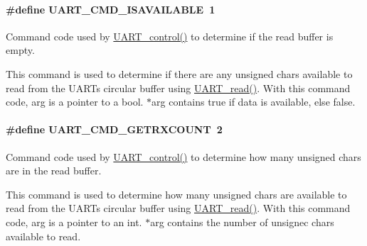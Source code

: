 \paragraph[{U\+A\+R\+T\+\_\+\+C\+M\+D\+\_\+\+I\+S\+A\+V\+A\+I\+L\+A\+B\+L\+E}]{\setlength{\rightskip}{0pt plus 5cm}\#define U\+A\+R\+T\+\_\+\+C\+M\+D\+\_\+\+I\+S\+A\+V\+A\+I\+L\+A\+B\+L\+E~1}\label{_u_a_r_t_8h_af5be6db621c5b048637dc93b26797693}


Command code used by \hyperlink{_u_a_r_t_8h_a9de3c26cfe4ce6b7f350a6ea6e16801d}{U\+A\+R\+T\+\_\+control()} to determine if the read buffer is empty. 

This command is used to determine if there are any unsigned chars available to read from the U\+A\+R\+T\textquotesingle{}s circular buffer using \hyperlink{_u_a_r_t_8h_a023152d57539cad94bdd813956013e73}{U\+A\+R\+T\+\_\+read()}. With this command code, arg is a pointer to a bool. $\ast$arg contains true if data is available, else false. 
\paragraph[{U\+A\+R\+T\+\_\+\+C\+M\+D\+\_\+\+G\+E\+T\+R\+X\+C\+O\+U\+N\+T}]{\setlength{\rightskip}{0pt plus 5cm}\#define U\+A\+R\+T\+\_\+\+C\+M\+D\+\_\+\+G\+E\+T\+R\+X\+C\+O\+U\+N\+T~2}\label{_u_a_r_t_8h_a470321cbd9eccf137ffbe6553ae7f35f}


Command code used by \hyperlink{_u_a_r_t_8h_a9de3c26cfe4ce6b7f350a6ea6e16801d}{U\+A\+R\+T\+\_\+control()} to determine how many unsigned chars are in the read buffer. 

This command is used to determine how many unsigned chars are available to read from the U\+A\+R\+T\textquotesingle{}s circular buffer using \hyperlink{_u_a_r_t_8h_a023152d57539cad94bdd813956013e73}{U\+A\+R\+T\+\_\+read()}. With this command code, arg is a pointer to an int. $\ast$arg contains the number of unsignec chars available to read. 
